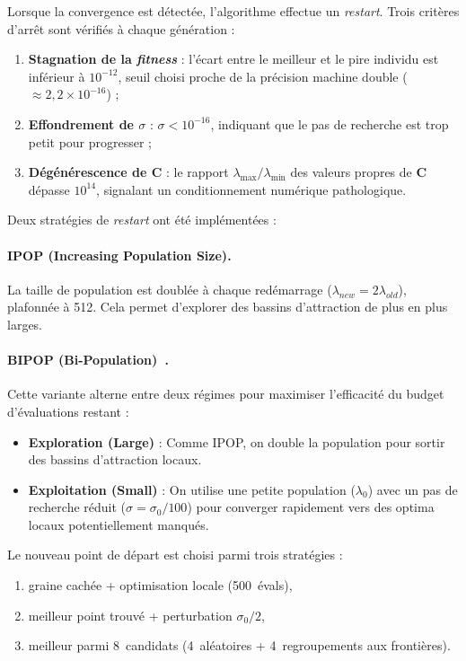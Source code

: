 Lorsque la convergence est détectée, l'algorithme effectue un \textit{restart}.
Trois critères d'arrêt sont vérifiés à chaque génération :
\begin{enumerate}[nosep]
  \item \textbf{Stagnation de la \textit{fitness}} : l'écart entre le meilleur
        et le pire individu est inférieur à $10^{-12}$, seuil choisi proche de
        la précision machine double ($\approx 2{,}2 \times 10^{-16}$) ;
  \item \textbf{Effondrement de $\sigma$} : $\sigma < 10^{-16}$, indiquant
        que le pas de recherche est trop petit pour progresser ;
  \item \textbf{Dégénérescence de $\mathbf{C}$} : le rapport
        $\lambda_{\max}/\lambda_{\min}$ des valeurs propres de $\mathbf{C}$
        dépasse $10^{14}$, signalant un conditionnement numérique pathologique.
\end{enumerate}
Deux stratégies de \textit{restart} ont été implémentées :

\paragraph{IPOP (Increasing Population Size).}
La taille de population est doublée à chaque redémarrage ($\lambda_{new} = 2 \lambda_{old}$), plafonnée à 512. Cela permet d'explorer des bassins d'attraction de plus en plus larges.

\paragraph{BIPOP (Bi-Population)~\cite{hansen2009}.}
Cette variante alterne entre deux régimes pour maximiser l'efficacité du budget d'évaluations restant :
\begin{itemize}[nosep]
    \item \textbf{Exploration (Large)} : Comme IPOP, on double la population pour sortir des bassins d'attraction locaux.
    \item \textbf{Exploitation (Small)} : On utilise une petite population ($\lambda_0$) avec un pas de recherche réduit ($\sigma = \sigma_0 / 100$) pour converger rapidement vers des optima locaux potentiellement manqués.
\end{itemize}

Le nouveau point de départ est choisi parmi trois stratégies :
\begin{enumerate}[nosep]
  \item[40\%] graine cachée + optimisation locale (500~évals),
  \item[30\%] meilleur point trouvé + perturbation $\sigma_0/2$,
  \item[30\%] meilleur parmi 8~candidats (4~aléatoires + 4~regroupements aux frontières).
\end{enumerate}


